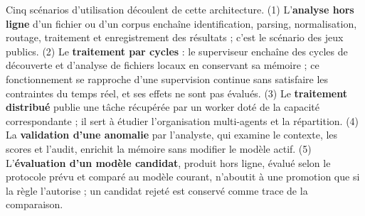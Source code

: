 Cinq scénarios d'utilisation découlent de cette architecture. (1) L'\textbf{analyse hors ligne} d'un fichier ou d'un corpus enchaîne identification, parsing, normalisation, routage, traitement et enregistrement des résultats ; c'est le scénario des jeux publics. (2) Le \textbf{traitement par cycles} : le superviseur enchaîne des cycles de découverte et d'analyse de fichiers locaux en conservant sa mémoire ; ce fonctionnement se rapproche d'une supervision continue sans satisfaire les contraintes du temps réel, et ses effets ne sont pas évalués. (3) Le \textbf{traitement distribué} publie une tâche récupérée par un worker doté de la capacité correspondante ; il sert à étudier l'organisation multi-agents et la répartition. (4) La \textbf{validation d'une anomalie} par l'analyste, qui examine le contexte, les scores et l'audit, enrichit la mémoire sans modifier le modèle actif. (5) L'\textbf{évaluation d'un modèle candidat}, produit hors ligne, évalué selon le protocole prévu et comparé au modèle courant, n'aboutit à une promotion que si la règle l'autorise ; un candidat rejeté est conservé comme trace de la comparaison.
